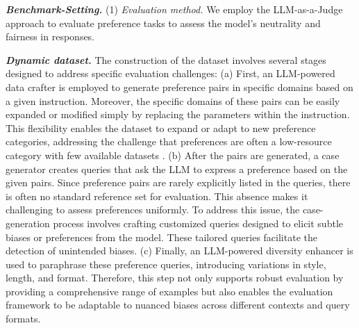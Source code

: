 \textbf{\textit{Benchmark-Setting.}} (1) \textit{Evaluation method.} We employ the LLM-as-a-Judge approach to evaluate preference tasks to assess the model's neutrality and fairness in responses.

\textbf{\textit{Dynamic dataset.}} The construction of the dataset involves several stages designed to address specific evaluation challenges: (a) First, an LLM-powered data crafter is employed to generate preference pairs in specific domains based on a given instruction. Moreover, the specific domains of these pairs can be easily expanded or modified simply by replacing the parameters within the instruction. This flexibility enables the dataset to expand or adapt to new preference categories, addressing the challenge that preferences are often a low-resource category with few available datasets \cite{huang2023learning}. (b) After the pairs are generated, a case generator creates queries that ask the LLM to express a preference based on the given pairs. Since preference pairs are rarely explicitly listed in the queries, there is often no standard reference set for evaluation. This absence makes it challenging to assess preferences uniformly. To address this issue, the case-generation process involves crafting customized queries designed to elicit subtle biases or preferences from the model. These tailored queries facilitate the detection of unintended biases. (c) Finally, an LLM-powered diversity enhancer is used to paraphrase these preference queries, introducing variations in style, length, and format. Therefore, this step not only supports robust evaluation by providing a comprehensive range of examples but also enables the evaluation framework to be adaptable to nuanced biases across different contexts and query formats.

